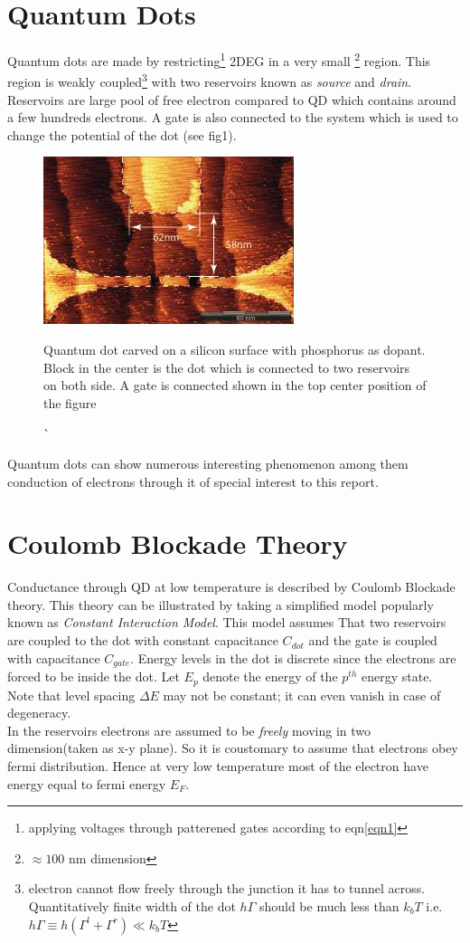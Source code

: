 \documentclass[a4paper]{report}
\begin{document}
  \section*{Quantum Dots}
    \hspace{10pt} Quantum dots are made by restricting\footnote{applying voltages through patterened gates according to eqn\ref{eqn1}} 2DEG in a very small \footnote{$\approx 100$ nm dimension} region. This region is weakly coupled\footnote{electron cannot flow freely through the junction it has to tunnel across. Quantitatively finite width of the dot $h\Gamma$ should be much less than $k_{b}T$ i.e. $h\Gamma \equiv h(\Gamma^l + \Gamma^r) \ll k_{b}T$} with two reservoirs known as \emph{source} and \emph{drain}. Reservoirs are large pool of free electron compared to QD which contains around a few hundreds electrons. A gate is also connected to the system which is used to change the potential of the dot (see fig1).
    \begin{figure}[h]
      \centering
      \includegraphics[scale=0.7]{image/df}
      \caption`{Quantum dot carved on a silicon surface with phosphorus as dopant.  Block in the center is the dot which is connected to two reservoirs on both side. A gate is connected shown in the top center position of the figure}
    \end{figure}
    Quantum dots can show numerous interesting phenomenon among them conduction of electrons through it of special interest to this report.

  \section*{Coulomb Blockade Theory}
    \hspace{10pt} Conductance through QD at low temperature is described by Coulomb Blockade theory. This theory can be illustrated by taking a simplified model popularly known as \emph{Constant Interaction Model}. This model assumes That two reservoirs are coupled to the dot with constant capacitance $C_{dot}$ and the gate is coupled with capacitance $C_{gate}$.  Energy levels in the dot is discrete since the electrons are forced to be inside the dot. Let $E_{p}$ denote the energy of the $p^{th}$ energy state. Note that level spacing $\Delta E$ may not be constant; it can even vanish in case of degeneracy. \\
    In the reservoirs electrons are assumed to be \emph{freely} moving  in two dimension(taken as x-y plane). So it is coustomary to assume that electrons obey fermi distribution. Hence at very low temperature most of the electron have energy equal to fermi energy $E_{F}$. 
\end{document}
